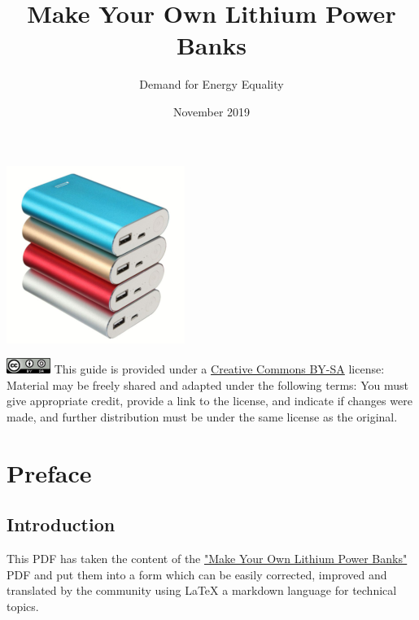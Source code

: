 \documentclass{article}
\title{Make Your Own Lithium Power Banks}
\author{Demand for Energy Equality}
\date{November 2019}
\theoremstyle{definition}
\theoremstyle{definition}
\theoremstyle{remark}
\begin{document}
 
\maketitle{}

\begin{center}
  \includegraphics[]{Images/image_0_1_(power_banks).png}
\end{center}

\vfill
  
\includegraphics[]{Images/image_0_2_(license).png} \newline
This guide is provided under a \href{https://creativecommons.org/licenses/by-sa/4.0/legalcode}{Creative Commons BY-SA} license: \newline
Material may be freely shared and adapted under the following terms: You must give appropriate credit, provide a link to the license, and indicate if changes were made, and further distribution must be under the same license as the original.

\newpage

\tableofcontents

\newpage

\section{Preface} %
\label{sec:preface}

  \subsection*{Introduction} %
  \label{sub:introduction}
  
    This PDF has taken the content of the \href{https://www.demandenergyequality.org/make-your-own-power-banks}{"Make Your Own Lithium Power Banks"} PDF and put them into a form which can be easily corrected, improved and translated by the community using LaTeX a markdown language for technical topics.
\end{document}

